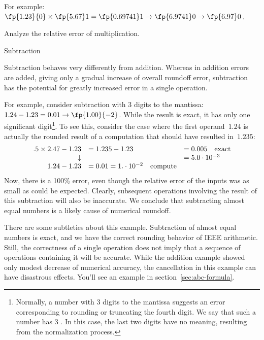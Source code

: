 For example: $\fp{1.23}{0}\times\fp{5.67}1=\fp{0.69741}1\rightarrow
\fp{6.9741}0\rightarrow\fp{6.97}0$.

\begin{exercise}
  Analyze the relative error of multiplication.
\end{exercise}

 {Subtraction}
\label{sec:subtraction}

Subtraction behaves very differently from addition. Whereas in
addition errors are added, giving only a gradual increase of overall
roundoff error, subtraction has the potential for greatly increased
error in a single operation. 

For example, consider subtraction with 3 digits to the mantissa:
$1.24-1.23=0.01\rightarrow \fp{1.00}{-2}$. While the result is exact,
it has only one significant digit\footnote
{Normally, a number with 3
  digits to the mantissa suggests an error corresponding to rounding
  or truncating the fourth digit. We say that such a number has 3
  . In this case, the last two digits have no
  meaning, resulting from the normalization process.}.
To see this, consider
the case where the first operand~$1.24$ is actually the rounded result
of a computation that should have resulted in~$1.235$:
\begin{equation}
\begin{array}{rll}
  .5\times 2.47-1.23&=1.235-1.23&=0.005\quad\hbox{exact}\\
  \downarrow&&=5.0\cdot 10^{-3}\\
  1.24-1.23&=0.01=1.\cdot 10^{-2}\quad\hbox{compute}\\
\end{array}
\end{equation}
Now, there is a 100\% error, even though the relative error of the
inputs was as small as could be expected. Clearly, subsequent
operations involving the result of this subtraction will also be
inaccurate.
We conclude that subtracting almost equal numbers is a likely cause of
numerical roundoff.

There are some subtleties about this example. Subtraction of almost
equal numbers is exact, and we have the correct rounding behavior of
IEEE arithmetic. Still, the correctness of a single operation does not
imply that a sequence of operations containing it will be
accurate. While the addition example showed only modest decrease of
numerical accuracy, the cancellation in this example can have
disastrous effects. You'll see an example in section~\ref{sec:abc-formula}.

